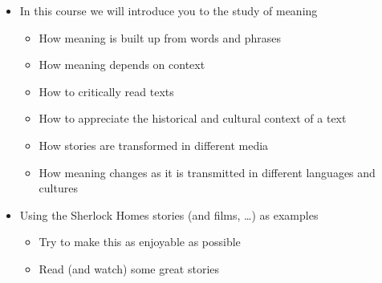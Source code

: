 \documentclass[a4paper,landscape,headrule,footrule,xetex,25pt]{foils}
\begin{document}
\maketitle

%



\begin{itemize}
\item In this course we will introduce you to the study of meaning
  \begin{itemize}
  \item How meaning is built up from words and phrases
  \item How meaning depends on context
  \item How to critically read texts
  \item How to appreciate the historical and cultural context of a text
  \item How stories are transformed in different media
  \item  How meaning changes as it is transmitted in different languages and cultures 
  \end{itemize}
\item Using the Sherlock Homes stories (and films, \ldots{}) as examples
  \begin{itemize}
  \item Try to make this as enjoyable as possible
  \item Read (and watch) some great stories
  \end{itemize}
\end{itemize}
\end{document}
